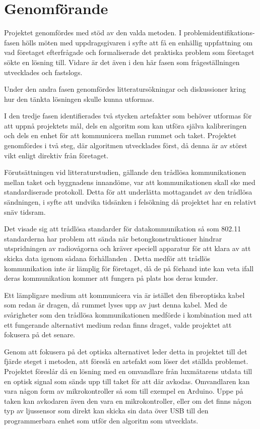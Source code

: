 \section{Genomförande} %
\label{sec:genomf_rande}

    Projektet genomfördes med stöd av den valda metoden. I problemidentifikations-fasen hölls möten med uppdragsgivaren i syfte att få en enhällig uppfattning om vad företaget efterfrågade och formaliserade det praktiska problem som företaget sökte en lösning till. Vidare är det även i den här fasen som frågeställningen utvecklades och fastslogs. \bigskip

    Under den andra fasen genomfördes litteratursökningar och diskussioner kring hur den tänkta lösningen skulle kunna utformas.  \bigskip

    I den tredje fasen identifierades två stycken artefakter som behöver utformas för att uppnå projektets mål, dels en algoritm som kan utföra själva kalibreringen och dels en enhet för att kommunicera mellan rummet och taket. Projektet genomfördes i två steg, där algoritmen utvecklades först, då denna är av störst vikt enligt direktiv från företaget.\bigskip

    Förutsättningen vid litteraturstudien, gällande den trådlösa kommunikationen mellan taket och byggnadens innandöme, var att kommunikationen skall ske med standardiserade protokoll. Detta för att underlätta mottagandet av den trådlösa sändningen, i syfte att undvika tidsänken i felsökning då projektet har en relativt snäv tidsram.\bigskip

    Det visade sig att trådlösa standarder för datakommunikation så som 802.11 standarderna har problem att sända när betongkonstruktioner hindrar utspridningen av radiovågorna och kräver speciell apparatur för att klara av att skicka data igenom sådana förhållanden \cite{11n}. Detta medför att trådlös kommunikation inte är lämplig för företaget, då de på förhand inte kan veta ifall deras kommunikation kommer att fungera på plats hos deras kunder. \bigskip

    Ett lämpligare medium att kommunicera via är istället den fiberoptiska kabel som redan är dragen, då rummet lyses upp av just denna kabel. Med de svårigheter som den trådlösa kommunikationen medförde i kombination med att ett fungerande alternativt medium redan finns draget, valde projektet att fokusera på det senare. \bigskip

    Genom att fokusera på det optiska alternativet leder detta in projektet till det fjärde steget i metoden, att föreslå en artefakt som löser det ställda problemet. Projektet föreslår då en lösning med en omvandlare från luxmätarens utdata till en optisk signal som sänds upp till taket för att där avkodas. Omvandlaren kan vara någon form av mikrokontroller så som till exempel en Arduino. Uppe på taken kan avkodaren även den vara en mikrokontroller, eller om det finns någon typ av ljussensor som direkt kan skicka sin data över USB till den programmerbara enhet som utför den algoritm som utvecklats.

